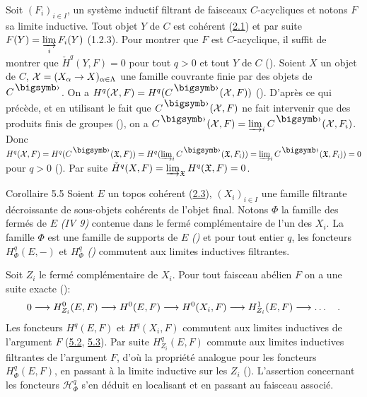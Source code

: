 \documentclass[10pt]{../fichiers-configuration-latex/smfart}
\begin{document}
Soit $(F_i)_{i \in I}$, un système inductif filtrant de faisceaux
$C$-acycliques et notons $F$ sa limite inductive. Tout objet $Y$ de
$C$ est cohérent (\hyperref[VI.prop2.1]{2.1}) et par suite $F(Y) =
\displaystyle\mathop{\varinjlim}_i F_i (Y)$
(1.2.3). Pour montrer que $F$ est $C$-acyclique, il suffit de montrer
que $\check{H}^{q} (Y, F) = 0$ pour tout $q > 0$ et tout $Y$ de $C$
(). Soient $X$ un objet de $C$, $\Xx = (X_{\alpha} \to
X)_{\alpha \in \Lambda}$ une famille couvrante finie par des objets de
$C^{\bigdot}$. On a $H^{q} (\Xx, F) = H^q (C^{\bigdot}(\Xx, F))$
(). D'après ce qui précède, et en utilisant le fait que
$C^{\bigdot}(\Xx, F)$ ne fait intervenir que des produits finis de
groupes (), on a $C^{\bigdot}(\Xx, F) =
\varinjlim_i C^{\bigdot}(\Xx, F_i)$. Donc $H^q
(\Xx, F) = H^q (C^{\bigdot}(\mathfrak{X}, F)) = H^q
(\varinjlim_i C^{\bigdot}(\mathfrak{X}, F_i)) =
\varinjlim_i C^{\bigdot}(\mathfrak{X}, F_i)) = 0$ pour $q
> 0$ (). Par suite $\check{H}^q (X, F) =
\varinjlim_{\mathfrak{X}}  H^q (\mathfrak{X}, F) =
0$.

\begin{enonce*}{Corollaire 5.5}
Soient $E$ un topos cohérent (\hyperref[VI.def2.3]{2.3}), ${(X_i)_{i \in I}}$
une famille filtrante décroissante de sous-objets cohérents de
l'objet final. Notons $\Phi$ la famille des fermés de $E$ \emph{(IV
9)} contenue dans le fermé complémentaire de l'un des $X_i$. La
famille $\Phi$ est une famille de supports de $E$
\emph{()} et pour tout entier $q$, les foncteurs
$H^q_{\Phi} (E, -)$ et $H^q_{\Phi}$ \emph{()}
commutent aux limites inductives filtrantes.
\end{enonce*}

Soit $Z_i$ le fermé complémentaire de $X_i$. Pour tout faisceau
abélien $F$ on a une suite exacte ():
$$
0 \to H^{0}_{Z_i} (E, F) \to H^{0} (E, F) \to H^{0} (X_i, F) \to
H^{1}_{Z_i} (E, F) \to \ldots\quad {\quoi}.
$$
Les foncteurs $H^q(E, F)$ et $H^q(X_i, F)$ commutent aux limites
inductives de l'argument $F$ (\hyperref[VI.cor5.2]{5.2}, \hyperref[VI.cor5.3]{5.3}). Par
suite $H^q_{Z_i} (E, F)$ commute aux limites inductives filtrantes
de l'argument $F$, d'où la propriété analogue pour les foncteurs
$H^q_{\Phi}(E, F)$, en passant à la limite inductive sur les $Z_i$
(). L'assertion concernant les foncteurs
$ℋ^q_{\Phi}$ s'en déduit en localisant et en passant au
faisceau associé.
\end{document}
